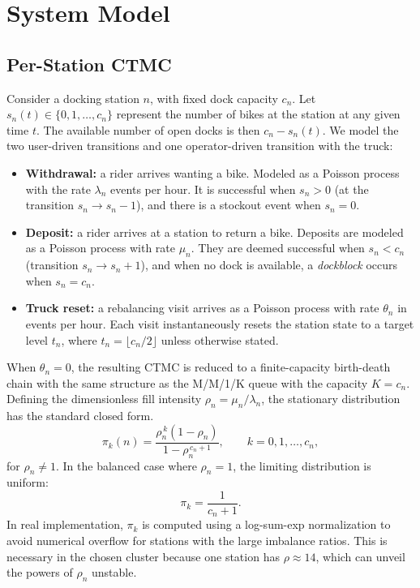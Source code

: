\documentclass[conference]{IEEEtran}
\begin{document}
\section{System Model}\label{sec:model}
\subsection{Per-Station CTMC}

Consider a docking station $n$, with fixed dock capacity $c_n$. Let $s_n(t) \in \{0, 1, \ldots, c_n\}$ represent the number of bikes at the station at any given time $t$. The available number of open docks is then $c_n-s_n(t)$. We model the two user-driven transitions and one operator-driven transition with the truck:

\begin{itemize}
\item \textbf{Withdrawal:} a rider arrives wanting a bike. Modeled as a Poisson process with the rate $\lambda_n$ events per hour. It is successful when $s_n > 0$ (at the transition $s_n \to s_n - 1$), and there is a stockout event when $s_n = 0$.
\item \textbf{Deposit:} a rider arrives at a station to return a bike. Deposits are modeled as a Poisson process with rate $\mu_n$. They are deemed successful when $s_n < c_n$ (transition $s_n \to s_n + 1$), and when no dock is available, a \textit{dockblock} occurs when $s_n = c_n$.
\item \textbf{Truck reset:} a rebalancing visit arrives as a Poisson process with rate $\theta_n$ in events per hour. Each visit instantaneously resets the station state to a target level $t_n$, where $t_n = \lfloor c_n / 2 \rfloor$ unless otherwise stated.
\end{itemize}

When $\theta_n = 0$, the resulting CTMC is reduced to a finite-capacity birth-death chain with the same structure as the M/M/1/K queue with the capacity $K = c_n$. Defining the dimensionless fill intensity $\rho_n = \mu_n / \lambda_n$, the stationary distribution has the standard closed form.
 \begin{equation}\label{eq:pi_closed}
\pi_k(n) = \frac{\rho_n^{\,k} (1 - \rho_n)}{1 - \rho_n^{\,c_n + 1}}, \qquad k = 0, 1, \ldots, c_n,
\end{equation}
for $\rho_n \neq 1$. In the balanced case where $\rho_n=1$, the limiting distribution is uniform:
\[
\pi_k = \frac{1}{c_n+1}.
\]
In real implementation, $\pi_k$ is computed using a log-sum-exp normalization to avoid numerical overflow for stations with the large imbalance ratios. This is necessary in the chosen cluster because one station has $\rho \approx 14$, which can unveil the powers of $\rho_n$ unstable.
\end{document}
